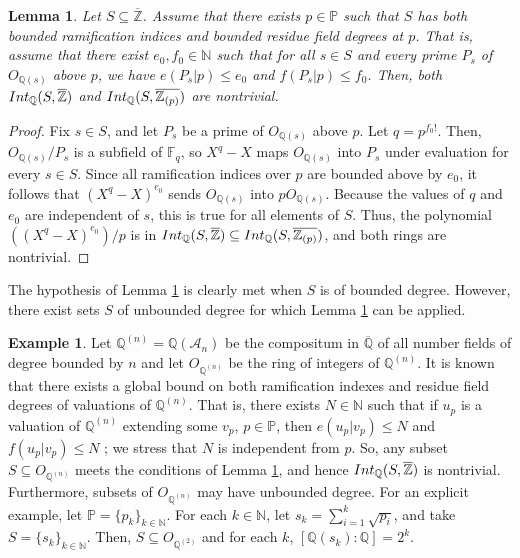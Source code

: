 \documentclass{article}
\newtheorem{Lem}[equation]{Lemma}
\theoremstyle{definition}\newtheorem{Def}[equation]{Definition}
\newtheorem{Ex}[equation]{Example}
\theoremstyle{definition}\newtheorem{Ques}[equation]{Question}
\theoremstyle{definition}\newtheorem{Conj}[equation]{Conjecture}
\theoremstyle{definition}\newtheorem{Not}[equation]{Notation}
\newcommand{\N}{\mathbb{N}}
\newcommand{\Q}{\mathbb{Q}}
\newcommand{\F}{\mathbb{F}}
\newcommand{\oQ}{\overline{\Q}}
\newcommand{\oZ}{\overline{\Z}}
\newcommand{\Z}{\mathbb{Z}}
\newcommand{\Int}{\textnormal{Int}}
\newcommand{\IntQ}{\Int_{\Q}}
\newcommand{\PP}{\mathbb{P}}
\numberwithin{equation}{section}
\begin{document}
\begin{Lem}\label{Bounded ram and res field}
Let $S \subseteq \oZ$. Assume that there exists $p \in \PP$ such that $S$ has both bounded ramification indices and bounded residue field degrees at $p$. That is, assume that there exist $e_0, f_0 \in \N$ such that for all $s \in S$ and every prime $P_s$ of $O_{\Q(s)}$ above $p$, we have $e(P_s|p) \leq e_0$ and $f(P_s|p) \leq f_0$. Then, both $\IntQ(S,\oZ)$ and $\IntQ(S,\overline{\Z_{(p)}})$ are nontrivial.
\end{Lem}
\begin{proof}
Fix $s \in S$, and let $P_s$ be a prime of $O_{\Q(s)}$ above $p$. Let $q=p^{f_0!}$. Then, $O_{\Q(s)}/P_s$ is a subfield of $\F_{q}$, so $X^q-X$ maps $O_{\Q(s)}$ into $P_s$ under evaluation for every $s\in S$. Since all ramification indices over $p$ are bounded above by $e_0$, it follows that $(X^q-X)^{e_0}$ sends $O_{\Q(s)}$ into $pO_{\Q(s)}$. Because the values of $q$ and $e_0$ are independent of $s$, this is true for all elements of $S$. Thus, the polynomial $((X^q-X)^{e_0})/p$ is in $\IntQ(S,\oZ) \subseteq \IntQ(S,\overline{\Z_{(p)}})$, and both rings are nontrivial.
\end{proof}
 
The hypothesis of Lemma \ref{Bounded ram and res field} is clearly met when $S$ is of bounded degree. However, there exist sets $S$ of unbounded degree for which Lemma \ref{Bounded ram and res field} can be applied.

\begin{Ex}\label{Qn}
Let $\Q^{(n)}=\Q(\mathcal A_n)$ be the compositum in $\oQ$ of all number fields of degree bounded by $n$ and let $O_{\Q^{(n)}}$ be the ring of integers of $\Q^{(n)}$. It is known that there exists a global bound on both ramification indexes and residue field degrees of valuations of $\Q^{(n)}$. That is, there exists $N\in\N$ such that if $u_p$ is a valuation of $\Q^{(n)}$ extending some $v_p$, $p\in\PP$, then $e(u_p|v_p)\leq N$ and $f(u_p|v_p)\leq N$ \cite[Proposition 4.5.3, p. 118]{BG}; we stress that $N$ is independent from $p$. So, any subset $S \subseteq O_{\Q^{(n)}}$ meets the conditions of Lemma \ref{Bounded ram and res field}, and hence $\IntQ(S,\oZ)$ is nontrivial. Furthermore, subsets of $O_{\Q^{(n)}}$ may have unbounded degree. For an explicit example, let $\PP=\{p_k\}_{k\in\N}$. For each $k\in\N$, let $s_k=\sum_{i=1}^k\sqrt{p_i}$, and take $S=\{s_k\}_{k\in\N}$. Then, $S \subseteq O_{\Q^{(2)}}$ and for each $k$, $[\Q(s_k):\Q] = 2^k$.
\end{Ex}
\end{document}
